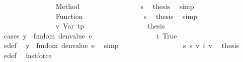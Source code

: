 \begin{isabellebody}
\ \ \ \ \ \ \ \ \ \ \ \ \ \ \isamarkupfalse%
\ {\isacharparenleft}{\kern0pt}Method\ {\isacharunderscore}{\kern0pt}{\isacharparenright}{\kern0pt}\isanewline
\ \ \ \ \ \ \ \ \ \ \ \ \ \ \isamarkupfalse%
\ s{}\ \isamarkupfalse%
\ {\isacharquery}{\kern0pt}thesis\ \isamarkupfalse%
\ simp\isanewline
\ \ \ \ \ \ \ \ \ \ \ \ \isamarkupfalse%
\isanewline
\ \ \ \ \ \ \ \ \ \ \ \ \ \ \isamarkupfalse%
\ {\isacharparenleft}{\kern0pt}Function\ {\isacharunderscore}{\kern0pt}{\isacharparenright}{\kern0pt}\isanewline
\ \ \ \ \ \ \ \ \ \ \ \ \ \ \isamarkupfalse%
\ s{}\ \isamarkupfalse%
\ {\isacharquery}{\kern0pt}thesis\ \isamarkupfalse%
\ simp\isanewline
\ \ \ \ \ \ \ \ \ \ \ \ \isamarkupfalse%
\isanewline
\ \ \ \ \ \ \ \ \ \ \ \ \ \ \isamarkupfalse%
\ v{}{\isacharcolon}{\kern0pt}\ {\isacharparenleft}{\kern0pt}Var\ tp{\isacharprime}{\kern0pt}{\isacharparenright}{\kern0pt}\isanewline
\ \ \ \ \ \ \ \ \ \ \ \ \ \ \isamarkupfalse%
\ \isamarkupfalse%
\ {\isacharquery}{\kern0pt}thesis\isanewline
\ \ \ \ \ \ \ \ \ \ \ \ \ \ \isamarkupfalse%
\ {\isacharparenleft}{\kern0pt}cases\ {\isachardoublequoteopen}y\ {\isacharbar}{\kern0pt}{\isasymin}{\isacharbar}{\kern0pt}\ fmdom\ {\isacharparenleft}{\kern0pt}denvalue\ e{\isacharparenright}{\kern0pt}{\isachardoublequoteclose}{\isacharparenright}{\kern0pt}\isanewline
\ \ \ \ \ \ \ \ \ \ \ \ \ \ \ \ \isamarkupfalse%
\ t{}{\isacharcolon}{\kern0pt}\ True\isanewline
\ \ \ \ \ \ \ \ \ \ \ \ \ \ \ \ \isamarkupfalse%
\ e{\isacharprime}{\kern0pt}{\isacharunderscore}{\kern0pt}def\ \isamarkupfalse%
\ {\isachardoublequoteopen}y\ {\isacharbar}{\kern0pt}{\isasymin}{\isacharbar}{\kern0pt}\ fmdom\ {\isacharparenleft}{\kern0pt}denvalue\ e{\isacharprime}{\kern0pt}{\isacharparenright}{\kern0pt}{\isachardoublequoteclose}\ \isamarkupfalse%
\ simp\isanewline
\ \ \ \ \ \ \ \ \ \ \ \ \ \ \ \ \isamarkupfalse%
\ s{}\ s{}\ v{}\ f{}\ v{}\ \isamarkupfalse%
\ {\isacharquery}{\kern0pt}thesis\ \isamarkupfalse%
\ e{\isacharprime}{\kern0pt}{\isacharunderscore}{\kern0pt}def\ \isamarkupfalse%
\ fastforce\isanewline
\ \ \ \ \ \ \ \ \ \ \ \ \ \ \isamarkupfalse%
\isanewline
\ \ \ \ \ \ \ \ \ \ \ \ \ \ \ \ \isamarkupfalse%

\end{isabellebody}

